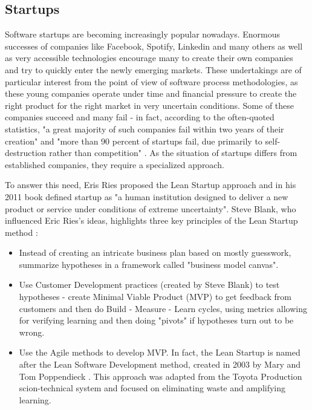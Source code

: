 \documentclass{article}
\begin{document}
\subsection{Startups}
Software startups are becoming increasingly popular nowadays. Enormous successes of companies like Facebook, Spotify, Linkedin and many others as well as very accessible technologies encourage many to create their own companies and try to quickly enter the newly emerging markets. These undertakings are of particular interest from the point of view of software process methodologies, as these young companies operate under time and financial pressure to create the right product for the right market in very uncertain conditions. Some of these companies succeed and many fail - in fact, according to the often-quoted statistics, "a great majority of such companies fail within two years of their creation" \cite{paternoster2014software} and "more than 90 percent of startups fail, due primarily to self-destruction rather than competition" \cite{giardino2014early}. As the situation of startups differs from established companies, they require a specialized approach. 

To answer this need, Eris Ries proposed the Lean Startup approach and in his 2011 book defined startup as "a human institution designed to deliver a new product or service under conditions of extreme uncertainty"\cite{ries2011lean}. Steve Blank, who influenced Eric Ries's ideas, highlights three key principles of the Lean Startup method \cite{blank2013lean}:
\begin{itemize}
  \item Instead of creating an intricate business plan based on mostly guesswork, summarize hypotheses in a framework called "business model canvas".
  \item Use Customer Development practices (created by Steve Blank) to test hypotheses - create Minimal Viable Product (MVP) to get feedback from customers and then do Build - Measure - Learn cycles, using metrics allowing for verifying learning and then doing "pivots" if hypotheses turn out to be wrong.
  \item Use the Agile methods to develop MVP. In fact, the Lean Startup is named after the Lean Software Development method, created in 2003 by Mary and Tom Poppendieck \cite{poppendieck2003lean}. This approach was adapted from the Toyota Production scion-technical system and focused on eliminating waste and amplifying learning.
\end{itemize}
\end{document}
